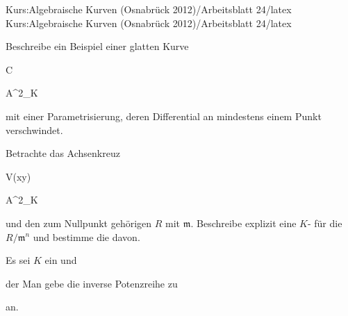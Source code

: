 Kurs:Algebraische Kurven (Osnabrück 2012)/Arbeitsblatt 24/latex
Kurs:Algebraische Kurven (Osnabrück 2012)/Arbeitsblatt 24/latex


\setcounter{section}{24}





{}

{


Beschreibe ein Beispiel einer glatten Kurve


\mavergleichskette

{\vergleichskette

{ C
}

{ \subseteq }{ {\mathbb A}^{2}_{K}
}

{  }{
}

{    }{
}

{   }{
}

}
{}{}{}
mit einer Parametrisierung, deren Differential an mindestens einem Punkt verschwindet.


}

{} {}



{}

{


Betrachte das Achsenkreuz


\mavergleichskette

{\vergleichskette

{ V(xy)
}

{ \subseteq }{ {\mathbb A}^{2}_{K}
}

{  }{
}

{    }{
}

{   }{
}

}
{}{}{}
und den zum Nullpunkt gehörigen
$R$ mit
${\mathfrak m}$. Beschreibe explizit eine
$K$-
für die
$R/{\mathfrak m}^n$ und bestimme die
davon.


}

{} {}



{}

{


Es sei $K$ ein
und

 der
Man gebe die inverse Potenzreihe zu

 an.


}

